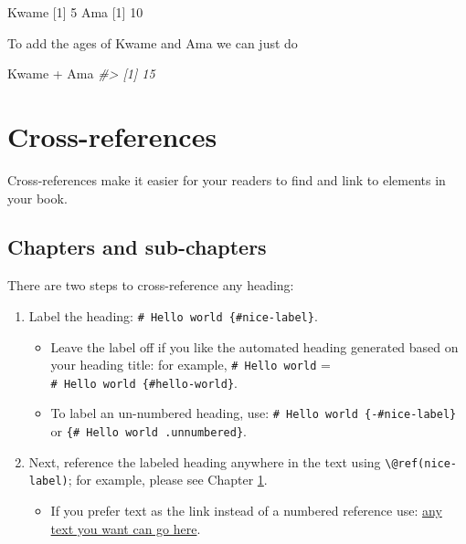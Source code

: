 \documentclass[
]{book}
\newenvironment{Shaded}{\begin{snugshade}}{\end{snugshade}}
\newcommand{\CommentTok}[1]{\textcolor[rgb]{0.56,0.35,0.01}{\textit{#1}}}
\newcommand{\DecValTok}[1]{\textcolor[rgb]{0.00,0.00,0.81}{#1}}
\newcommand{\NormalTok}[1]{#1}
\newcommand{\SpecialCharTok}[1]{\textcolor[rgb]{0.00,0.00,0.00}{#1}}
\providecommand{\tightlist}{%
  \setlength{\itemsep}{0pt}\setlength{\parskip}{0pt}}
\theoremstyle{definition}
\theoremstyle{definition}
\theoremstyle{definition}
\theoremstyle{definition}
\theoremstyle{remark}
\begin{document}
\begin{Shaded}
\begin{Highlighting}[]
\NormalTok{Kwame}
\NormalTok{[}\DecValTok{1}\NormalTok{] }\DecValTok{5}
\NormalTok{Ama}
\NormalTok{[}\DecValTok{1}\NormalTok{] }\DecValTok{10}
\end{Highlighting}
\end{Shaded}

To add the ages of Kwame and Ama we can just do

\begin{Shaded}
\begin{Highlighting}[]
\NormalTok{Kwame }\SpecialCharTok{+}\NormalTok{ Ama}
\CommentTok{\#\textgreater{} [1] 15}
\end{Highlighting}
\end{Shaded}

\hypertarget{cross}{%
\chapter{Cross-references}\label{cross}}

Cross-references make it easier for your readers to find and link to elements in your book.

\hypertarget{chapters-and-sub-chapters}{%
\section{Chapters and sub-chapters}\label{chapters-and-sub-chapters}}

There are two steps to cross-reference any heading:

\begin{enumerate}
\def\labelenumi{\arabic{enumi}.}
\tightlist
\item
  Label the heading: \texttt{\#\ Hello\ world\ \{\#nice-label\}}.

  \begin{itemize}
  \tightlist
  \item
    Leave the label off if you like the automated heading generated based on your heading title: for example, \texttt{\#\ Hello\ world} = \texttt{\#\ Hello\ world\ \{\#hello-world\}}.
  \item
    To label an un-numbered heading, use: \texttt{\#\ Hello\ world\ \{-\#nice-label\}} or \texttt{\{\#\ Hello\ world\ .unnumbered\}}.
  \end{itemize}
\item
  Next, reference the labeled heading anywhere in the text using \texttt{\textbackslash{}@ref(nice-label)}; for example, please see Chapter \ref{cross}.

  \begin{itemize}
  \tightlist
  \item
    If you prefer text as the link instead of a numbered reference use: \protect\hyperlink{cross}{any text you want can go here}.
  \end{itemize}
\end{enumerate}
\end{document}
